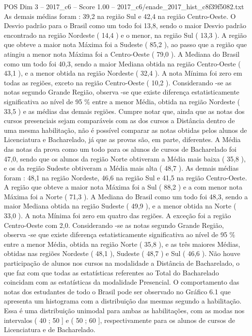 \begin{textsample}{POS Dim 3 – 2017\_c6 – Score 1.00 – 2017\_c6/enade\_2017\_hist\_c8f39f5082.txt}
As demais médias foram : 39,2 na região Sul e 42,4 na região Centro-Oeste.
O Desvio padrão para o Brasil como um todo foi 13,8, sendo o maior Desvio padrão encontrado na região Nordeste ( 14,4 ) e o menor, na região Sul ( 13,3 ).
A região que obteve a maior nota Máxima foi a Sudeste ( 85,2 ), ao passo que a região que atingiu a menor nota Máxima foi a Centro-Oeste ( 79,0 ).
A Mediana do Brasil como um todo foi 40,3, sendo a maior Mediana obtida na região Centro-Oeste ( 43,1 ), e a menor obtida na região Nordeste ( 32,4 ).
A nota Mínima foi zero em todas as regiões, exceto na região Centro-Oeste ( 10,2 ).
Considerando -se as notas segundo Grande Região, observa -se que existe diferença estatisticamente significativa ao nível de 95 \% entre a menor Média, obtida na região Nordeste ( 33,5 ) e as médias das demais regiões.
Cumpre notar que, ainda que as notas dos cursos presenciais sejam comparáveis com as dos cursos a Distância dentro de uma mesma habilitação, não é possível comparar as notas obtidas pelos alunos de Licenciatura e Bacharelado, já que as provas são, em parte, diferentes.
A Média das notas da prova como um todo para os alunos de cursos de Bacharelado foi 47,0, sendo que os alunos da região Norte obtiveram a Média mais baixa ( 35,8 ), e os da região Sudeste obtiveram a Média mais alta ( 48,7 ).
As demais médias foram : 48,1 na região Nordeste, 46,6 na região Sul e 41,5 na região Centro-Oeste.
A região que obteve a maior nota Máxima foi a Sul ( 88,2 ) e a com menor nota Máxima foi a Norte ( 71,3 ).
A Mediana do Brasil como um todo foi 48,3, sendo a maior Mediana obtida na região Sudeste ( 49,9 ), e a menor obtida na Norte ( 33,0 ).
A nota Mínima foi zero em quatro das regiões.
A exceção foi a região Centro-Oeste com 2,0.
Considerando -se as notas segundo Grande Região, observa -se que existe diferença estatisticamente significativa ao nível de 95 \% entre a menor Média, obtida na região Norte ( 35,8 ), e as três maiores Médias, obtidas nas regiões Nordeste ( 48,1 ), Sudeste ( 48,7 ) e Sul ( 46,6 ).
Não houve participação de alunos nos cursos na modalidade a Distância de Bacharelado, o que faz com que todas as estatísticas referentes ao Total do Bacharelado coincidam com as estatísticas da modalidade Presencial.
O comportamento das notas dos estudantes de todo o Brasil pode ser observado no Gráfico 6.1 que apresenta um histograma com a distribuição das mesmas segundo a habilitação.
Essa é uma distribuição unimodal para ambas as habilitações, com as modas nos intervalos ( 40 ; 50 ] e ( 50 ; 60 ], respectivamente para os alunos de cursos de Licenciatura e de Bacharelado.

\end{textsample}

